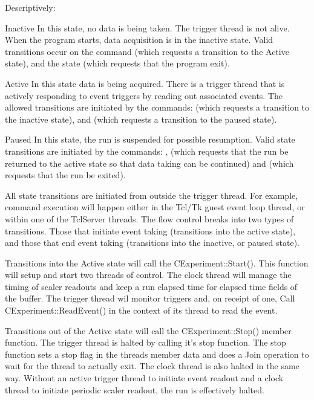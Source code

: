    Descriptively:
   \begin{description}
      \item{Inactive}  In this state, no data is being taken.  The 
		   trigger thread is not alive.  When the program starts,
		   data acquisition is in the inactive state.  Valid transitions
		   occur on the   command (which requests
		   a transition to the Active state), and the 
		   state (which requests that the program exit).
      \item{Active} In this state data is being acquired.  There is a trigger
	 thread that is actively responding to event triggers by reading out
	 associated events.  The allowed transitions are initiated by the
	 commands:  (which requests a transition to the
	 inactive state), and  (which requests a 
	 transition to the paused state).
      \item{Paused}  In this state, the run is suspended for possible 
	 resumption.  Valid state transitions are initiated by the commands:
	 , (which requests that the run be returned to
	 the active state so that data taking can be continued) and 
	  (which requests that the run be exited).
   \end{description}
   
   All state transitions are initiated from outside the trigger thread. For
   example, command execution will happen either in the Tcl/Tk guest
   event loop thread, or within one of the TclServer threads.
   The flow control breaks into two types of transitions.  Those that initiate
   event taking (transitions into the active state), and those that 
   end event taking (transitions into the inactive, or paused state).
   
   Transitions into the Active state will call the CExperiment::Start().
   This function will setup and start two threads of control.  The clock 
   thread will manage the timing of scaler readouts and keep a run
   elapsed time for elapsed time fields of the buffer.  The trigger thread
   wil monitor triggers and, on receipt of one, Call CExperiment::ReadEvent()
   in the context of its thread to read the event.
   
   Transitions out of the Active state will call the CExperiment::Stop()
   member function.  The trigger thread is halted by calling it's stop function.
   The stop function sets a stop flag in the threads member data and does
   a Join operation to wait for the thread to actually exit.  The clock thread
   is also halted in the same way.  Without an active trigger thread to 
   initiate event readout and a clock thread to initiate periodic scaler readout,
   the run is effectively halted.
   
